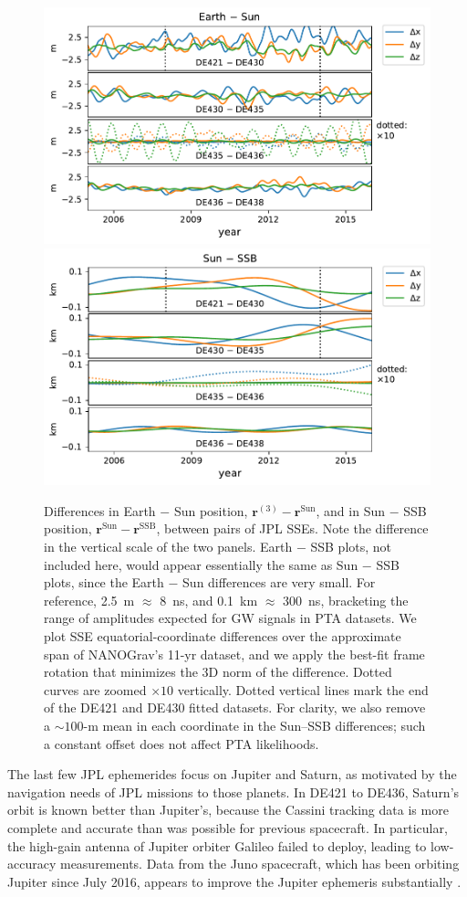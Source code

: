 \documentclass{aastex63}
\begin{document}
\begin{figure}[t]
    \centering
    \includegraphics[width=0.49\columnwidth]{EarthSunDiff.pdf}
    \includegraphics[width=0.49\columnwidth]{SunSSBDiff.pdf}
    \caption{Differences in Earth $-$ Sun position, $\mathbf{r}^{(3)} - \mathbf{r}^\mathrm{Sun}$, and in Sun $-$ SSB position, $\mathbf{r}^\mathrm{Sun} - \mathbf{r}^\mathrm{SSB}$, between pairs of JPL SSEs. Note the difference in the vertical scale of the two panels.
    Earth $-$ SSB plots, not included here, would appear essentially the same as Sun $-$ SSB plots, since the Earth $-$ Sun differences are very small. For reference, 2.5~m $\approx$ 8~ns, and 0.1~km $\approx$ 300~ns, bracketing the range of amplitudes expected for GW signals in PTA datasets.
    We plot SSE equatorial-coordinate differences over the approximate span of NANOGrav's 11-yr dataset, and we apply the best-fit frame rotation that minimizes the 3D norm of the difference. Dotted curves are zoomed $\times 10$ vertically. Dotted vertical lines mark the end of the DE421 and DE430 fitted datasets.
    For clarity, we also remove a $\sim 100$-m mean in each coordinate in the Sun--SSB differences; such a constant offset does not affect PTA likelihoods.
    \label{fig:earthsun}}
\end{figure}

The last few JPL ephemerides focus on Jupiter and Saturn, as motivated by the navigation needs of JPL missions to those planets. In DE421 to DE436, Saturn's orbit is known better than Jupiter's, because the Cassini tracking data is more complete and accurate than was possible for previous spacecraft. In particular, the high-gain antenna of Jupiter orbiter Galileo failed to deploy, leading to low-accuracy measurements. Data from the Juno spacecraft, which has been orbiting Jupiter since July 2016, appears to improve the Jupiter ephemeris substantially \citep{2009IPNPR.178C...1F}.
\end{document}
